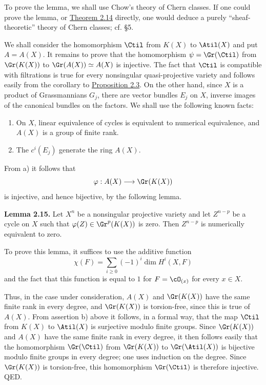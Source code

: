 To prove the lemma, we shall use Chow's theory of Chern classes. If one could prove the lemma, or \hyperlink{sga6.e00.thm.2-14}{Theorem 2.14} directly, one would deduce a purely ``sheaf-theoretic'' theory of Chern classes; cf. \S 5.

We shall consider the homomorphism $\Ctil$ from $K(X)$ to $\Atil(X)$ and put $A=A(X)$. It remains to prove that the homomorphism $\psi=\Gr(\Ctil)$ from $\Gr(K(X))$ to $\Gr(A(X))\simeq A(X)$ is injective. The fact that $\Ctil$ is compatible with filtrations is true for every nonsingular quasi-projective variety and follows easily from the corollary to \hyperlink{sga6.e00.prop.2-3}{Proposition 2.3}. On the other hand, since $X$ is a product of Grassmannians $G_j$, there are vector bundles $E_j$ on $X$, inverse images of the canonical bundles on the factors. We shall use the following known facts:
\begin{enumerate}[label=\alph*)]
\item On $X$, linear equivalence of cycles is equivalent to numerical equivalence, and $A(X)$ is a group of finite rank.
\item The $c^i(E_j)$ generate the ring $A(X)$.
\end{enumerate}
From a) it follows that
\[
 \varphi:A(X)\longrightarrow \Gr(K(X))
\]
is injective, and hence bijective, by the following lemma.

\textbf{Lemma 2.15.} Let $X^n$ be a nonsingular projective variety and let $Z^{n-p}$ be a cycle on $X$ such that $\varphi(Z)\in\Gr^p(K(X))$ is zero. Then $Z^{n-p}$ is numerically equivalent to zero.

To prove this lemma, it suffices to use the additive function
\[
 \chi(F)=\sum_{i\geq 0}(-1)^i\dim H^i(X,F)
\]
and the fact that this function is equal to $1$ for $F=\cO_{(x)}$ for every $x\in X$.

Thus, in the case under consideration, $A(X)$ and $\Gr(K(X))$ have the same finite rank in every degree, and $\Gr(K(X))$ is torsion-free, since this is true of $A(X)$. From assertion b) above it follows, in a formal way, that the map $\Ctil$ from $K(X)$ to $\Atil(X)$ is surjective modulo finite groups. Since $\Gr(K(X))$ and $A(X)$ have the same finite rank in every degree, it then follows easily that the homomorphism $\Gr(\Ctil)$ from $\Gr(K(X))$ to $\Gr(\Atil(X))$ is bijective modulo finite groups in every degree; one uses induction on the degree. Since $\Gr(K(X))$ is torsion-free, this homomorphism $\Gr(\Ctil)$ is therefore injective. QED.

